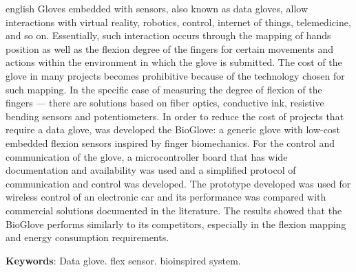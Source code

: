 \documentclass[
	12pt,				%
	openright,			%
	oneside,			%
	a4paper,			%
	english,			%
	brazil				%
	]{abntex2}
\begin{document}
\begin{resumo}[Abstract]
 \begin{otherlanguage*}{english}
\hspace{1.5cm}Gloves embedded with sensors, also known as data gloves, allow interactions with virtual reality, robotics, control, internet of things, telemedicine, and so on. Essentially, such interaction occurs through the mapping of hands position as well as the flexion degree of the fingers for certain movements and actions within the environment in which the glove is submitted. The cost of the glove in many projects becomes prohibitive because of the technology chosen for such mapping. In the specific case of measuring the degree of flexion of the fingers --- there are solutions based on fiber optics, conductive ink, resistive bending sensors and potentiometers. In order to reduce the cost of projects that require a data glove, was developed the BioGlove: a generic glove with low-cost embedded flexion sensors inspired by finger biomechanics. For the control and communication of the glove, a microcontroller board that has wide documentation and availability was used and a simplified protocol of communication and control was developed. The prototype developed was used for wireless control of an electronic car and its performance was compared with commercial solutions documented in the literature. The results showed that the BioGlove performs similarly to its competitors, especially in the flexion mapping and energy consumption requirements.

   \vspace{\onelineskip}
 
   \noindent 
   \textbf{Keywords}: Data glove. flex sensor. bioinspired system.
 \end{otherlanguage*}
\end{resumo}


\listoffigures*
\cleardoublepage

\listoftables*
\cleardoublepage
\end{document}
